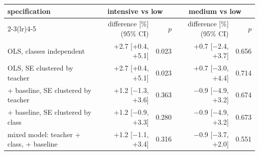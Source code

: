 \begin{tabular}{lrrrr}
\toprule
specification & \multicolumn{2}{c}{intensive vs low} & \multicolumn{2}{c}{medium vs low} \\ \cmidrule(lr){2-3}\cmidrule(lr){4-5}
& difference [\%] (95\% CI) & $p$ & difference [\%] (95\% CI) & $p$ \\
\midrule
OLS, classes independent & +2.7 [+0.4, +5.1] & 0.023 & +0.7 [$-$2.4, +3.7] & 0.656 \\
OLS, SE clustered by teacher & +2.7 [+0.4, +5.1] & 0.023 & +0.7 [$-$3.0, +4.4] & 0.714 \\
+ baseline, SE clustered by teacher & +1.2 [$-$1.3, +3.6] & 0.363 & $-$0.9 [$-$4.9, +3.2] & 0.674 \\
+ baseline, SE clustered by class & +1.2 [$-$0.9, +3.3] & 0.280 & $-$0.9 [$-$4.9, +3.2] & 0.673 \\
mixed model: teacher + class, + baseline & +1.2 [$-$1.1, +3.4] & 0.316 & $-$0.9 [$-$3.7, +2.0] & 0.551 \\
\bottomrule
\end{tabular}
